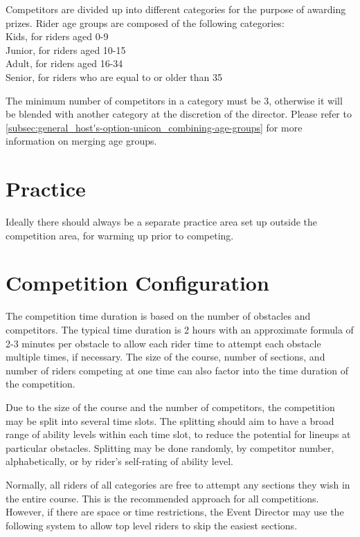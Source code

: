 Competitors are divided up into different categories for the purpose of awarding prizes.
Rider age groups are composed of the following categories:\\
Kids, for riders aged 0-9\\
Junior, for riders aged 10-15\\
Adult, for riders aged 16-34\\
Senior, for riders who are equal to or older than 35

The minimum number of competitors in a category must be 3, otherwise it will be blended with another category at the discretion of the director.
Please refer to \ref{subsec:general_host's-option-unicon_combining-age-groups} for more information on merging age groups.

\section{Practice}

Ideally there should always be a separate practice area set up outside the competition area, for warming up prior to competing.

\section{Competition Configuration}

The competition time duration is based on the number of obstacles and competitors.
The typical time duration is 2 hours with an approximate formula of 2-3 minutes per obstacle to allow each rider time to attempt each obstacle multiple times, if necessary.
The size of the course, number of sections, and number of riders competing at one time can also factor into the time duration of the competition.

Due to the size of the course and the number of competitors, the competition may be split into several time slots.
The splitting should aim to have a broad range of ability levels within each time slot, to reduce the potential for lineups at particular obstacles.
Splitting may be done randomly, by competitor number, alphabetically, or by rider's self-rating of ability level.

\label{sec:trials_section-restrictions-for-competition-categories}
Normally, all riders of all categories are free to attempt any sections they wish in the entire course.
This is the recommended approach for all competitions.
However, if there are space or time restrictions, the Event Director may use the following system to allow top level riders to skip the easiest sections.

